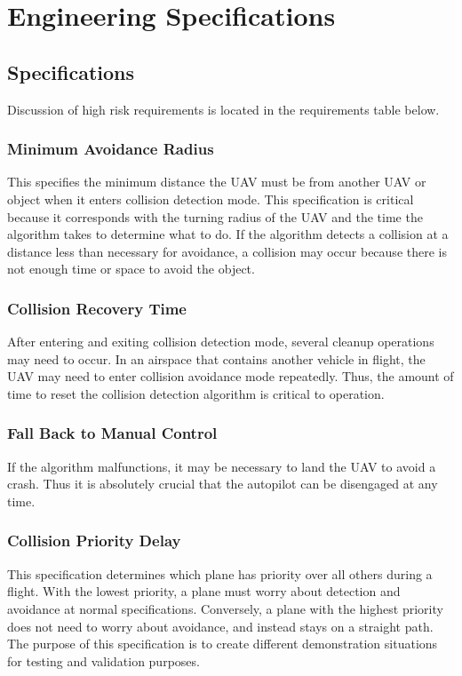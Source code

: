 \documentclass[12pt]{article}
\begin{document}
\section{Engineering Specifications}
\subsection{Specifications}
Discussion of high risk requirements is located in the requirements table below.

\subsubsection{Minimum Avoidance Radius}
This specifies the minimum distance the UAV must be from another UAV or object when it enters collision detection mode. This specification is critical because it corresponds with the turning radius of the UAV and the time the algorithm takes to determine  what to do. If the algorithm detects a collision at a distance less than necessary for avoidance, a collision may occur because there is not enough time or space to avoid the object.

\subsubsection{Collision Recovery Time}
After entering and exiting collision detection mode, several cleanup operations may need to occur. In an airspace that contains another vehicle in flight, the UAV may need to enter collision avoidance mode repeatedly. Thus, the amount of time to reset the collision detection algorithm is critical to operation.

\subsubsection{Fall Back to Manual Control}
If the algorithm malfunctions, it may be necessary to land the UAV to avoid a crash. Thus it is absolutely crucial that the autopilot can be disengaged at any time.

\subsubsection{Collision Priority Delay}
This specification determines which plane has priority over all others during a flight. With the lowest priority, a plane must worry about detection and avoidance at normal specifications. Conversely, a plane with the highest priority does not need to worry about avoidance, and instead stays on a straight path. The purpose of this specification is to create different demonstration situations for testing and validation purposes.
\end{document}
